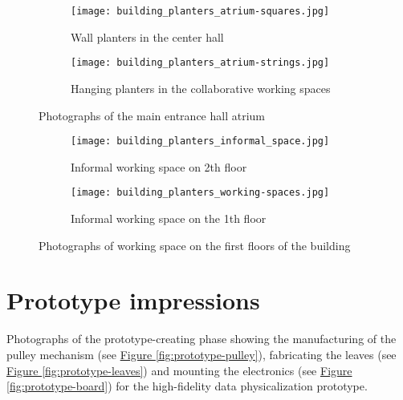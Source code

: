 \begin{appendices}
\begin{figure}[htbp]
    \centering
    \begin{subfigure}{0.48\textwidth}
        \centering
        \texttt{[image: building\_planters\_atrium-squares.jpg]}
        \caption{Wall planters in the center hall}
        \label{fig:atrium-squares}
    \end{subfigure}
    \hfill
    \begin{subfigure}{0.48\textwidth}
        \centering
        \texttt{[image: building\_planters\_atrium-strings.jpg]}
        \caption{Hanging planters in the collaborative working spaces}
        \label{fig:atrium-strings}
    \end{subfigure}
    \caption{Photographs of the main entrance hall atrium }
    \label{fig:building-atrium}
\end{figure}

\begin{figure}[htbp]
    \centering
    \begin{subfigure}{0.48\textwidth}
        \centering
        \texttt{[image: building\_planters\_informal\_space.jpg]}
        \caption{Informal working space on 2th floor}
        \label{fig:informal-space}
    \end{subfigure}
    \hfill
    \begin{subfigure}{0.48\textwidth}
        \centering
        \texttt{[image: building\_planters\_working-spaces.jpg]}
        \caption{Informal working space on the 1th floor}
        \label{fig:working-space}
    \end{subfigure}
    \caption{Photographs of working space on the first floors of the building}
    \label{fig:building-working-spaces}
\end{figure}

\section{Prototype impressions}
\label{appendix:prototype}

Photographs of the prototype-creating phase showing the manufacturing of the pulley mechanism (see \hyperref[fig:prototype-pulley]{Figure \ref{fig:prototype-pulley}}), fabricating the leaves (see \hyperref[fig:prototype-leaves]{Figure \ref{fig:prototype-leaves}}) and mounting the electronics (see \hyperref[fig:prototype-board]{Figure \ref{fig:prototype-board}}) for the high-fidelity data physicalization prototype.


\end{appendices}
